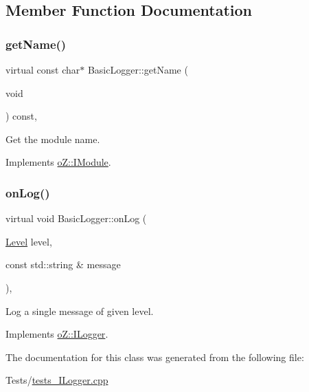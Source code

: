 \subsection{Member Function Documentation}
\mbox{\label{class_basic_logger_a832838fa70c5910babd911b767a5f6f7}} 
\subsubsection{\texorpdfstring{getName()}{getName()}}
{\footnotesize\ttfamily virtual const char$\ast$ Basic\+Logger\+::get\+Name (\begin{DoxyParamCaption}\item[{void}]{ }\end{DoxyParamCaption}) const\hspace{0.3cm}{\ttfamily [inline]}, {\ttfamily [virtual]}}



Get the module name. 



Implements \mbox{\hyperlink{classo_z_1_1_i_module_af41d45158fd28e1bd86a34e25f5282d6}{o\+Z\+::\+I\+Module}}.

\mbox{\label{class_basic_logger_a91033a43cfba1ab9235f1c7d035ff890}} 
\subsubsection{\texorpdfstring{onLog()}{onLog()}}
{\footnotesize\ttfamily virtual void Basic\+Logger\+::on\+Log (\begin{DoxyParamCaption}\item[{\mbox{\hyperlink{namespaceo_z_a72fc7662d5f07391ac6f0a5699014bfa}{Level}}}]{level,  }\item[{const std\+::string \&}]{message }\end{DoxyParamCaption})\hspace{0.3cm}{\ttfamily [inline]}, {\ttfamily [virtual]}}



Log a single message of given level. 



Implements \mbox{\hyperlink{classo_z_1_1_i_logger_a2e0e168c9218055e41bdd5b57177cba1}{o\+Z\+::\+I\+Logger}}.



The documentation for this class was generated from the following file\+:\begin{DoxyCompactItemize}
\item 
Tests/\mbox{\hyperlink{tests___i_logger_8cpp}{tests\+\_\+\+I\+Logger.\+cpp}}\end{DoxyCompactItemize}
